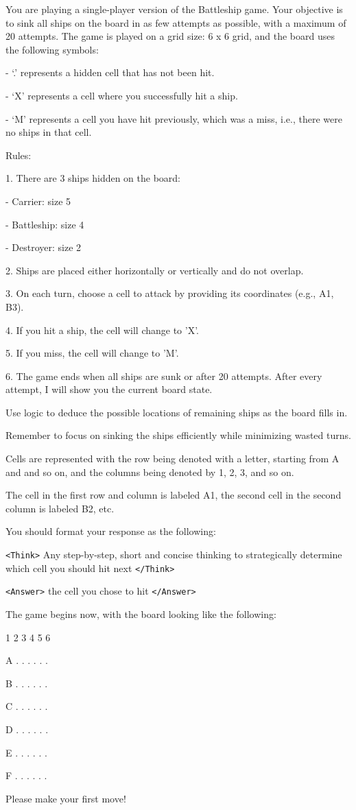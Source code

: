 \begin{tcolorbox}[colback=gray!20, colframe=black, title=Battleship Agent Prompt]
You are playing a single-player version of the Battleship game. Your objective is to sink all ships on the board in as few attempts as possible, with a maximum of 20 attempts. The game is played on a grid size: 6 x 6 grid, and the board uses the following symbols:

- `.' represents a hidden cell that has not been hit.

- `X' represents a cell where you successfully hit a ship.

- `M' represents a cell you have hit previously, which was a miss, i.e., there were no ships in that cell. 

Rules:

1. There are 3 ships hidden on the board:
     
     - Carrier: size 5
     
     - Battleship: size 4
     
     - Destroyer: size 2
     
2. Ships are placed either horizontally or vertically and do not overlap.

3. On each turn, choose a cell to attack by providing its coordinates (e.g., A1, B3).

4. If you hit a ship, the cell will change to 'X'.

5. If you miss, the cell will change to 'M'.

6. The game ends when all ships are sunk or after 20 attempts. After every attempt, I will show you the current board state. 

Use logic to deduce the possible locations of remaining ships as the board fills in.

Remember to focus on sinking the ships efficiently while minimizing wasted turns.

Cells are represented with the row being denoted with a letter, starting from A and and so on, and the columns being denoted by 1, 2, 3, and so on. 

The cell in the first row and column is labeled A1, the second cell in the second column is labeled B2, etc. 

You should format your response as the following: 

\texttt{<Think>} Any step-by-step, short and concise thinking to strategically determine which cell you should hit next \texttt{</Think>}

\texttt{<Answer>} the cell you chose to hit \texttt{</Answer>}

The game begins now, with the board looking like the following:      

1  2  3  4  5  6

A   .  .  .  .  .  .

B   .  .  .  .  .  .

C   .  .  .  .  .  .

D   .  .  .  .  .  .

E   .  .  .  .  .  .

F   .  .  .  .  .  . 

Please make your first move!
\end{tcolorbox}

